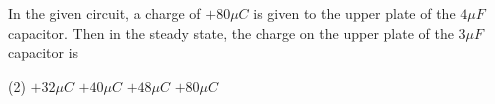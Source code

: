 
\item In the given circuit, a charge of \(+80 \mu C\) is given to the upper plate of the \(4 \mu F\) capacitor. Then in the steady state, the charge on the upper plate of the \(3 \mu F\) capacitor is
    \begin{center}
    \end{center}
    \begin{tasks}(2)
        \task \(+32 \mu C\)
        \task \(+40 \mu C\)
        \task \(+48 \mu C\)
        \task \(+80 \mu C\)
    \end{tasks}

